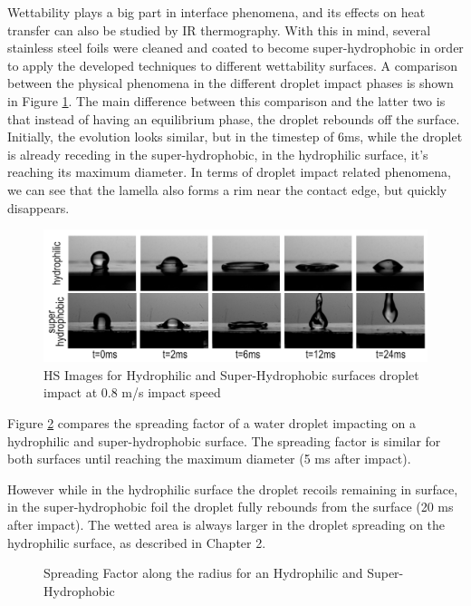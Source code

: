 \par Wettability plays a big part in interface phenomena, and its effects on heat transfer can also be studied by IR thermography. With this in mind, several stainless steel foils were cleaned and coated to become super-hydrophobic in order to apply the developed techniques to different wettability surfaces. A comparison between the physical phenomena in the different droplet impact phases is shown in Figure \ref{fig:hsshf}. The main difference between this comparison and the latter two is that instead of having an equilibrium phase, the droplet rebounds off the surface. Initially, the evolution looks similar, but in the timestep of 6ms, while the droplet is already receding in the super-hydrophobic, in the hydrophilic surface, it's reaching its maximum diameter. In terms of droplet impact related phenomena, we can see that the lamella also forms a rim near the contact edge, but quickly disappears.

\begin{figure}[h]
\centering
\includegraphics[width=1\linewidth]{Figures/5.Chapter/hsshf.png}
\caption{HS Images for Hydrophilic and Super-Hydrophobic surfaces droplet impact at 0.8 m/s impact speed}
\label{fig:hsshf}
\end{figure}

\par Figure \ref{fig:shfdiameter} compares the spreading factor of a water droplet impacting on a hydrophilic and super-hydrophobic surface. The spreading factor is similar for both surfaces until reaching the maximum diameter (5 ms after impact).\\ 
\par However while in the hydrophilic surface the droplet recoils remaining in surface, in the super-hydrophobic foil the droplet fully rebounds from the surface (20 ms after impact). The wetted area is always larger in the droplet spreading on the hydrophilic surface, as described in Chapter 2.\\

\begin{figure}[h!]
\centering

\caption{Spreading Factor along the radius for an Hydrophilic and Super-Hydrophobic}
\label{fig:shfdiameter}
\end{figure}

